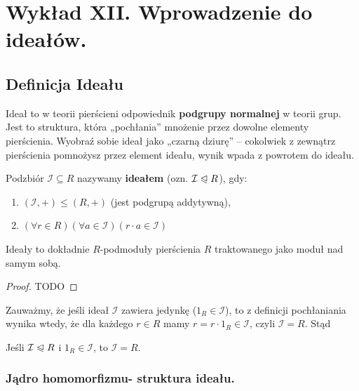 \chapter{Wykład XII. Wprowadzenie do ideałów.}

\section{Definicja Ideału}

\begin{intuition}
Ideał to w teorii pierścieni odpowiednik \textbf{podgrupy normalnej} w teorii grup. Jest to struktura, która „pochłania” mnożenie przez dowolne elementy pierścienia. Wyobraź sobie ideał jako „czarną dziurę” – cokolwiek z zewnątrz pierścienia pomnożysz przez element ideału, wynik wpada z powrotem do ideału.
\end{intuition}

\begin{definition}[Ideał]
Podzbiór $\mathcal{I} \subseteq R$ nazywamy \textbf{ideałem} (ozn. $\mathcal{I} \trianglelefteqslant  R$), gdy:
\begin{enumerate}[label=\arabic*.]
\item $(\mathcal{I}, +) \leq (R, +)$ (jest podgrupą addytywną),
\item $\left(\forall r \in R \right)\left(\forall a \in \mathcal{I} \right) \left( r\cdot a \in \mathcal{I} \right)  $
\end{enumerate}
\end{definition}

\begin{remark}
Ideały to dokładnie $R$-podmoduły pierścienia $R$ traktowanego jako moduł nad samym sobą.
\end{remark}
\begin{proof}
    TODO
\end{proof} 

Zauważmy, że jeśli ideał $\mathcal{I}$ zawiera jedynkę ($1_R \in \mathcal{I}$), to z definicji pochłaniania wynika wtedy, że dla każdego $r \in R$ mamy $r = r \cdot 1_R \in \mathcal{I}$, czyli $\mathcal{I} = R$. Stąd
\begin{corollary}
Jeśli $\mathcal{I} \trianglelefteqslant R$ i $1_R \in \mathcal{I}$, to $\mathcal{I} = R$.
\end{corollary}

\subsection*{Jądro homomorfizmu- struktura ideału.}

